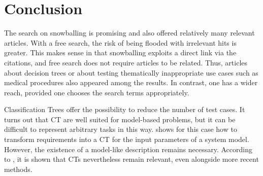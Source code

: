 \section{Conclusion}
\label{Kap:Conclusion}

The search on snowballing is promising and also offered relatively many relevant articles. With a free search, the risk of being flooded with irrelevant hits is greater. This makes sense in that snowballing exploits a direct link via the citations, and free search does not require articles to be related. Thus, articles about decision trees or about testing thematically inappropriate use cases such as medical procedures also appeared among the results. In contrast, one has a wider reach, provided one chooses the search terms appropriately.

Classification Trees offer the possibility to reduce the number of test cases. It turns out that CT are well suited for model-based problems, but it can be difficult to represent arbitrary tasks in this way.  \cite{Conrad} shows for this case how to transform requirements into a CT for the input parameters of a system model. However, the existence of a model-like description remains necessary. According to \cite{Belli}, it is shown that CTs nevertheless remain relevant, even alongside more recent methods.









